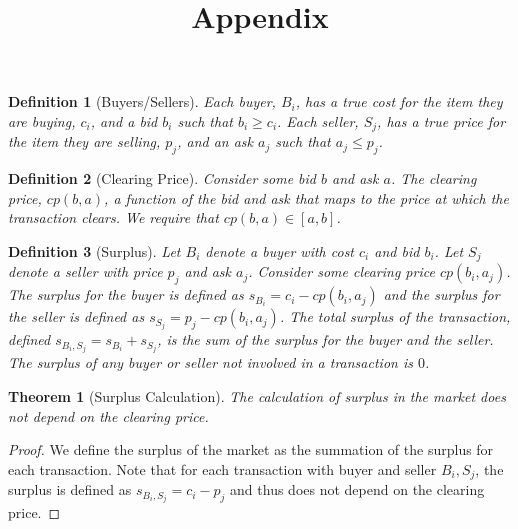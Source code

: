 \documentclass{article}
\newtheorem{theorem}{Theorem}
\newtheorem{definition}{Definition}
\begin{document}
\title{Appendix}
\date{}
\author{}
\maketitle
\begin{definition}[Buyers/Sellers]
    Each buyer, $B_i$, has a true cost for the item they are buying, $c_i$, and a bid $b_i$ such 
    that $b_i\ge c_i$. Each seller, $S_j$, has a true price for the item they are selling, $p_j$, and an ask $a_j$ such that $a_j\le p_j$.
\end{definition}
\begin{definition}[Clearing Price]
    Consider some bid $b$ and ask $a$. The clearing price, $cp(b,a)$, a function of the bid and ask that maps to the price at which the transaction clears.
    We require that $cp(b,a)\in [a,b]$.
\end{definition}
\begin{definition}[Surplus]
    Let $B_i$ denote a buyer with cost $c_i$ and bid $b_i$. Let $S_j$ denote a seller with price $p_j$ and ask $a_j$.
    Consider some clearing price $cp(b_i,a_j)$. The surplus for the buyer is defined as $s_{B_i}=c_i-cp(b_i,a_j)$ 
    and the surplus for the seller is defined as $s_{S_j}=p_j-cp(b_i,a_j)$. The total surplus of the transaction, 
    defined $s_{B_i,S_j}=s_{B_i}+s_{S_j}$, is the sum of the surplus for the buyer and the seller. The surplus of any buyer or 
    seller not involved in a transaction is $0$.
\end{definition}
\begin{theorem}[Surplus Calculation]
    The calculation of surplus in the market does not depend on the clearing price.
\end{theorem}
\begin{proof}
    We define the surplus of the market as the summation of the surplus for each transaction.
    Note that for each transaction with buyer and seller $B_i,S_j$, the surplus is defined as $s_{B_i,S_j}=c_i-p_j$
    and thus does not depend on the clearing price.
\end{proof}
\end{document}
